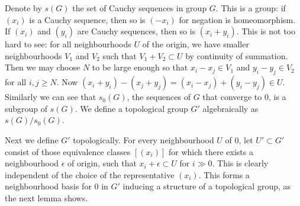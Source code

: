 \documentclass[12pt,a4paper,leqno]{article}
\theoremstyle{plain}
\theoremstyle{definition}
\theoremstyle{remark}
\begin{document}
Denote by $s(G)$ the set of Cauchy sequences in group $G$. This is a group: if $(x_i)$ is a Cauchy sequence, then so is $(-x_i)$ for negation is homeomorphism. If $(x_i)$ and $(y_i)$ are Cauchy sequences, then so is $(x_i + y_i)$. This is not too hard to see: for all neighbourhoods $U$ of the origin, we have smaller neighbourhoods $V_1$ and $V_2$ such that $V_1 + V_2 \subset U$ by continuity of summation. Then we may choose $N$ to be large enough so that $x_i-x_j \in V_1$ and $y_i-y_j \in V_2$ for all $i,j \geq N$. Now $(x_i + y_i) - (x_j + y_j) = (x_i - x_j) + (y_i - y_j) \in U$. Similarly we can see that $s_0(G)$, the sequences of $G$ that converge to 0, is a subgroup of $s(G)$. We define a topological group $G'$ algebraically as $s(G) / s_0(G)$.

Next we define $G'$ topologically. For every neighbourhood $U$ of 0, let $U' \subset G'$ consist of those equivalence classes $[(x_i)]$ for which there exists a neighbourhood $\epsilon$ of origin, such that $x_i + \epsilon \subset U$ for $i \gg 0$. This is clearly independent of the choice of the representative $(x_i)$. This forms a neighbourhood basis for $0$ in $G'$ inducing a structure of a topological group, as the next lemma shows. 
\end{document}

